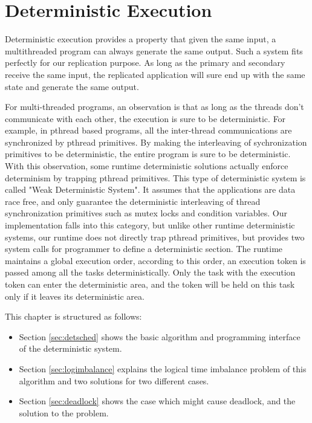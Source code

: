 \chapter{Deterministic Execution} \label{chap:detexec}
Deterministic execution provides a property that given the same input, a multithreaded program can always generate the same output. Such a system fits perfectly for our replication purpose. As long as the primary and secondary receive the same input, the replicated application will sure end up with the same state and generate the same output.

For multi-threaded programs, an observation is that as long as the threads don't communicate with each other, the execution is sure to be deterministic\cite{devietti2009dmp}. For example, in pthread based programs, all the inter-thread communications are synchronized by pthread primitives. By making the interleaving of sychronization primitives to be deterministic, the entire program is sure to be deterministic. With this observation, some runtime deterministic solutions actually enforce determinism by trapping pthread primitives\cite{cui2013parrot}\cite{liu2011dthreads}\cite{olszewski2009kendo}. This type of deterministic system is called "Weak Deterministic System". It assumes that the applications are data race free, and only guarantee the deterministic interleaving of thread synchronization primitives such as mutex locks and condition variables. Our implementation falls into this category, but unlike other runtime deterministic systems, our runtime does not directly trap pthread primitives, but provides two system calls for programmer to define a deterministic section. The runtime maintains a global execution order, according to this order, an execution token is passed among all the tasks deterministically. Only the task with the execution token can enter the deterministic area, and the token will be held on this task only if it leaves its deterministic area.

This chapter is structured as follows:
\begin{itemize}
\item Section \ref{sec:detsched} shows the basic algorithm and programming interface of the deterministic system.
\item Section \ref{sec:logimbalance} explains the logical time imbalance problem of this algorithm and two solutions for two different cases.
\item Section \ref{sec:deadlock} shows the case which might cause deadlock, and the solution to the problem.
\end{itemize}

